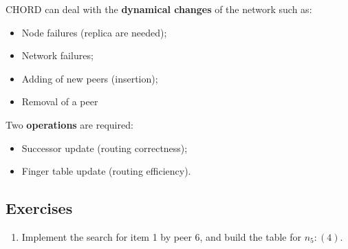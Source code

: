 CHORD can deal with the \textbf{dynamical changes} of the network such as:
\begin{itemize}
    \item Node failures (replica are needed);
    \item Network failures;
    \item Adding of new peers (insertion);
    \item Removal of a peer
\end{itemize}
Two \textbf{operations} are required:
\begin{itemize}
    \item Successor update (routing correctness);
    \item Finger table update (routing efficiency).
\end{itemize}

\newpage
\subsection{Exercises}
\begin{enumerate}
    \item Implement the search for item 1 by peer 6, and build the table for $n_5:(4)$.
\end{enumerate}